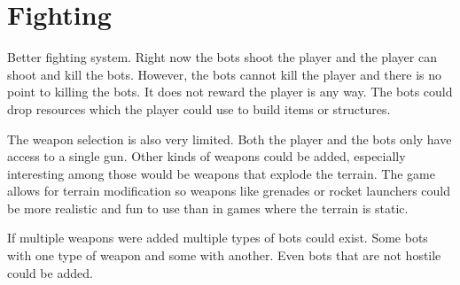 \section{Fighting}
Better fighting system. Right now the bots shoot the player and the player can shoot and kill the bots. 
However, the bots cannot kill the player and there is no point to killing the bots. 
It does not reward the player is any way.
The bots could drop resources which the player could use to build items or structures.

The weapon selection is also very limited.
Both the player and the bots only have access to a single gun.
Other kinds of weapons could be added, especially interesting among those would be weapons that explode the terrain.
The game allows for terrain modification so weapons like grenades or rocket launchers could be more realistic and fun to use than in games where the terrain is static.

If multiple weapons were added multiple types of bots could exist.
Some bots with one type of weapon and some with another.
Even bots that are not hostile could be added.
